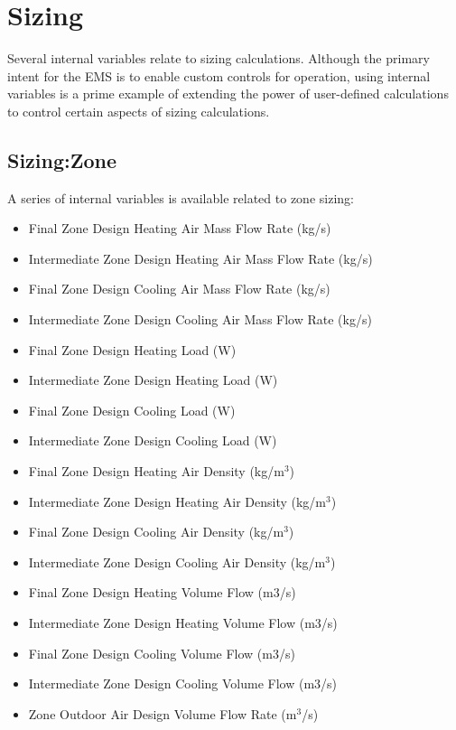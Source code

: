 \section{Sizing}\label{sizing-000}

Several internal variables relate to sizing calculations. Although the primary intent for the EMS is to enable custom controls for operation, using internal variables is a prime example of extending the power of user-defined calculations to control certain aspects of sizing calculations.

\subsection{Sizing:Zone}\label{sizingzone-000}

A series of internal variables is available related to zone sizing:

\begin{itemize}
\item
  Final Zone Design Heating Air Mass Flow Rate (kg/s)
\item
  Intermediate Zone Design Heating Air Mass Flow Rate (kg/s)
\item
  Final Zone Design Cooling Air Mass Flow Rate (kg/s)
\item
  Intermediate Zone Design Cooling Air Mass Flow Rate (kg/s)
\item
  Final Zone Design Heating Load (W)
\item
  Intermediate Zone Design Heating Load (W)
\item
  Final Zone Design Cooling Load (W)
\item
  Intermediate Zone Design Cooling Load (W)
\item
  Final Zone Design Heating Air Density (kg/m\(^{3}\))
\item
  Intermediate Zone Design Heating Air Density (kg/m\(^{3}\))
\item
  Final Zone Design Cooling Air Density (kg/m\(^{3}\))
\item
  Intermediate Zone Design Cooling Air Density (kg/m\(^{3}\))
\item
  Final Zone Design Heating Volume Flow (m3/s)
\item
  Intermediate Zone Design Heating Volume Flow (m3/s)
\item
  Final Zone Design Cooling Volume Flow (m3/s)
\item
  Intermediate Zone Design Cooling Volume Flow (m3/s)
\item
  Zone Outdoor Air Design Volume Flow Rate (m\(^{3}\)/s)
\end{itemize}

